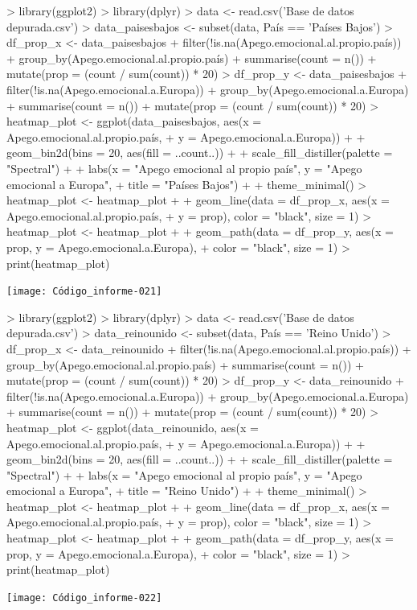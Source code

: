 \documentclass{article}
\begin{document}
\newpage
\begin{Schunk}
\begin{Sinput}
> library(ggplot2)
> library(dplyr)
> data <- read.csv('Base de datos depurada.csv')
> data_paisesbajos <- subset(data, País == 'Países Bajos')
> df_prop_x <- data_paisesbajos %
+   filter(!is.na(Apego.emocional.al.propio.país)) %
+   group_by(Apego.emocional.al.propio.país) %
+   summarise(count = n()) %
+   mutate(prop = (count / sum(count)) * 20)
> df_prop_y <- data_paisesbajos %
+   filter(!is.na(Apego.emocional.a.Europa)) %
+   group_by(Apego.emocional.a.Europa) %
+   summarise(count = n()) %
+   mutate(prop = (count / sum(count)) * 20)
> heatmap_plot <- ggplot(data_paisesbajos, aes(x = Apego.emocional.al.propio.país,
+                                  y = Apego.emocional.a.Europa)) +
+   geom_bin2d(bins = 20, aes(fill = ..count..)) +
+   scale_fill_distiller(palette = "Spectral") +
+   labs(x = "Apego emocional al propio país", y = "Apego emocional a Europa",
+        title = "Países Bajos") +
+   theme_minimal()
> heatmap_plot <- heatmap_plot +
+   geom_line(data = df_prop_x, aes(x = Apego.emocional.al.propio.país,
+                                   y = prop), color = "black", size = 1)
> heatmap_plot <- heatmap_plot +
+   geom_path(data = df_prop_y, aes(x = prop, y = Apego.emocional.a.Europa),
+             color = "black", size = 1)
> print(heatmap_plot)
\end{Sinput}
\end{Schunk}
\texttt{[image: Código\_informe-021]}

\newpage
\begin{Schunk}
\begin{Sinput}
> library(ggplot2)
> library(dplyr)
> data <- read.csv('Base de datos depurada.csv')
> data_reinounido <- subset(data, País == 'Reino Unido')
> df_prop_x <- data_reinounido %
+   filter(!is.na(Apego.emocional.al.propio.país)) %
+   group_by(Apego.emocional.al.propio.país) %
+   summarise(count = n()) %
+   mutate(prop = (count / sum(count)) * 20)
> df_prop_y <- data_reinounido %
+   filter(!is.na(Apego.emocional.a.Europa)) %
+   group_by(Apego.emocional.a.Europa) %
+   summarise(count = n()) %
+   mutate(prop = (count / sum(count)) * 20)
> heatmap_plot <- ggplot(data_reinounido, aes(x = Apego.emocional.al.propio.país,
+                                  y = Apego.emocional.a.Europa)) +
+   geom_bin2d(bins = 20, aes(fill = ..count..)) +
+   scale_fill_distiller(palette = "Spectral") +
+   labs(x = "Apego emocional al propio país", y = "Apego emocional a Europa",
+        title = "Reino Unido") +
+   theme_minimal()
> heatmap_plot <- heatmap_plot +
+   geom_line(data = df_prop_x, aes(x = Apego.emocional.al.propio.país,
+                                   y = prop), color = "black", size = 1)
> heatmap_plot <- heatmap_plot +
+   geom_path(data = df_prop_y, aes(x = prop, y = Apego.emocional.a.Europa),
+             color = "black", size = 1)
> print(heatmap_plot)
\end{Sinput}
\end{Schunk}
\texttt{[image: Código\_informe-022]}
\end{document}
